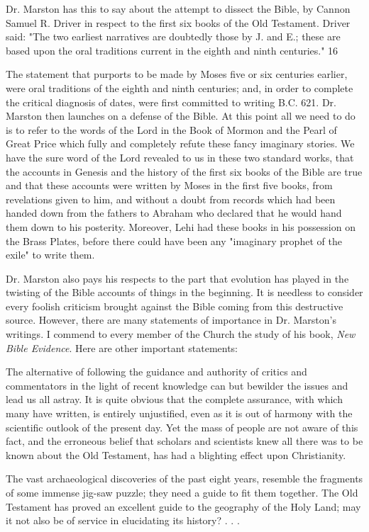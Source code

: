 Dr. Marston has this to say about the attempt to dissect the Bible, by Cannon Samuel R.
Driver in respect to the first six books of the Old Testament. Driver said: "The two earliest
narratives are doubtedly those by J. and E.; these are based upon the oral traditions current in
the eighth and ninth centuries." 16

The statement that purports to be made by Moses five or six centuries earlier, were oral
traditions of the eighth and ninth centuries; and, in order to complete the critical diagnosis of
dates, were first committed to writing B.C. 621. Dr. Marston then launches on a defense of
the Bible. At this point all we need to do is to refer to the words of the Lord in the Book of
Mormon and the Pearl of Great Price which fully and completely refute these fancy
imaginary stories. We have the sure word of the Lord revealed to us in these two standard
works, that the accounts in Genesis and the history of the first six books of the Bible are true
and that these accounts were written by Moses in the first five books, from revelations given
to him, and without a doubt from records which had been handed down from the fathers to
Abraham who declared that he would hand them down to his posterity. Moreover, Lehi had
these books in his possession on the Brass Plates, before there could have been any
"imaginary prophet of the exile" to write them.

Dr. Marston also pays his respects to the part that evolution has played in the twisting of the
Bible accounts of things in the beginning. It is needless to consider every foolish criticism
brought against the Bible coming from this destructive source. However, there are many
statements of importance in Dr. Marston's writings. I commend to every member of the
Church the study of his book, \textit{New Bible Evidence}. Here are other important statements:

The alternative of following the guidance and authority of critics and commentators in the
light of recent knowledge can but bewilder the issues and lead us all astray. It is quite
obvious that the complete assurance, with which many have written, is entirely unjustified,
even as it is out of harmony with the scientific outlook of the present day. Yet the mass of
people are not aware of this fact, and the erroneous belief that scholars and scientists knew
all there was to be known about the Old Testament, has had a blighting effect upon
Christianity.

The vast archaeological discoveries of the past eight years, resemble the fragments of some
immense jig-saw puzzle; they need a guide to fit them together. The Old Testament has
proved an excellent guide to the geography of the Holy Land; may it not also be of service in
elucidating its history? . . .

